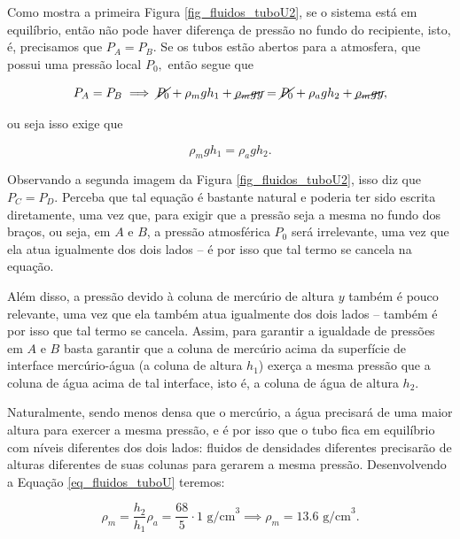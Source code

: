 \begin{exemplo}[Nível II]
Como mostra a primeira Figura \ref{fig_fluidos_tuboU2}, se o sistema está em equilíbrio, então não pode haver diferença de pressão no fundo do recipiente, isto, é, precisamos que $P_A = P_B.$ Se os tubos estão abertos para a atmosfera, que possui uma pressão local $P_0,$ então segue que

$$ P_A = P_B \implies \cancel {P_0 } + \rho_m gh_1+  \cancel {\rho_m gy } = \cancel {P_0 } + \rho_agh_2 + \cancel {\rho_m gy }, $$

\noindent ou seja isso exige que 

\begin{equation}
    \rho_m gh_1 =\rho_agh_2.
    \label{eq_fluidos_tuboU}
\end{equation}


Observando a segunda imagem da Figura \ref{fig_fluidos_tuboU2}, isso diz que $P_C = P_D.$ Perceba que tal equação é bastante natural e poderia ter sido escrita diretamente, uma vez que, para exigir que a pressão seja a mesma no fundo dos braços, ou seja, em $A$ e $B$, a pressão atmosférica $P_0$ será irrelevante, uma vez que ela atua igualmente dos dois lados -- é por isso que tal termo se cancela na equação. 

Além disso, a pressão devido à coluna de mercúrio de altura $y$ também é pouco relevante, uma vez que ela também atua igualmente dos dois lados -- também é por isso que tal termo se cancela. Assim, para garantir a igualdade de pressões em $A$ e $B$ basta garantir que a coluna de mercúrio acima da superfície de interface mercúrio-água (a coluna de altura $h_1$) exerça a mesma pressão que a coluna de água acima de tal interface, isto é, a coluna de água de altura $h_2.$



Naturalmente, sendo menos densa que o mercúrio, a água precisará de uma maior altura para exercer a mesma pressão, e é por isso que o tubo fica em equilíbrio com níveis diferentes dos dois lados: fluidos de densidades diferentes precisarão de alturas diferentes de suas colunas para gerarem a mesma pressão. Desenvolvendo a Equação \eqref{eq_fluidos_tuboU} teremos:

$$ \rho_m = \dfrac{h_2}{h_1} \rho_a = \dfrac{68}{5} \cdot 1 \text{ g/cm}^3 \implies \boxed{\rho_m =13.6 \text{ g/cm}^3.} $$

 


\end{exemplo}


\vspace{0.3cm}






